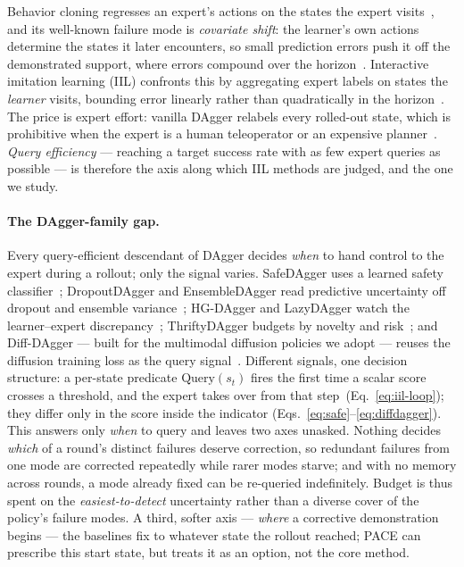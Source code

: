 \documentclass[letterpaper]{article} %
\begin{document}
Behavior cloning regresses an expert's actions on the states the expert
visits~\citep{pomerleau1988alvinn,pomerleau1991efficient}, and its
well-known failure mode is \emph{covariate shift}: the learner's own
actions determine the states it later encounters, so small prediction
errors push it off the demonstrated support, where errors compound over
the horizon~\citep{ross2011dagger}. Interactive imitation learning (IIL)
confronts this by aggregating expert labels on states the \emph{learner}
visits, bounding error linearly rather than quadratically in the
horizon~\citep{ross2011dagger,celemin2022iil}. The price is expert
effort: vanilla DAgger relabels every rolled-out state, which is
prohibitive when the expert is a human teleoperator or an expensive
planner~\citep{zhang2017safedagger,hoque2021thriftydagger}. \emph{Query
efficiency} --- reaching a target success rate with as few expert queries
as possible --- is therefore the axis along which IIL methods are judged,
and the one we study.

\paragraph{The DAgger-family gap.}
Every query-efficient descendant of DAgger decides \emph{when} to hand
control to the expert during a rollout; only the signal varies. SafeDAgger
uses a learned safety classifier~\citep{zhang2017safedagger}; DropoutDAgger
and EnsembleDAgger read predictive uncertainty off dropout and ensemble
variance~\citep{menda2017dropoutdagger,menda2019ensembledagger,
gal2016dropout,lakshminarayanan2017ensembles}; HG-DAgger and LazyDAgger watch
the learner--expert discrepancy~\citep{kelly2019hgdagger,hoque2021lazydagger};
ThriftyDAgger budgets by novelty and risk~\citep{hoque2021thriftydagger}; and
Diff-DAgger --- built for the multimodal diffusion policies we adopt --- reuses
the diffusion training loss as the query signal~\citep{lee2025diffdagger,
chi2023diffusionpolicy}. Different signals, one decision structure: a per-state
predicate $\mathrm{Query}(s_t)$ fires the first time a scalar score crosses a
threshold, and the expert takes over from that step~(Eq.~\ref{eq:iil-loop}); they
differ only in the score inside the indicator
(Eqs.~\ref{eq:safe}--\ref{eq:diffdagger}). This answers only \emph{when} to query
and leaves two axes unasked. Nothing decides \emph{which} of a round's distinct
failures deserve correction, so redundant failures from one mode are corrected
repeatedly while rarer modes starve; and with no memory across rounds, a
mode already fixed can be re-queried indefinitely. Budget is thus spent on the
\emph{easiest-to-detect} uncertainty rather than a diverse cover of the policy's
failure modes. A third, softer axis --- \emph{where} a corrective demonstration
begins --- the baselines fix to whatever state the rollout reached; PACE can
prescribe this start state, but treats it as an option, not the core method.
\end{document}
